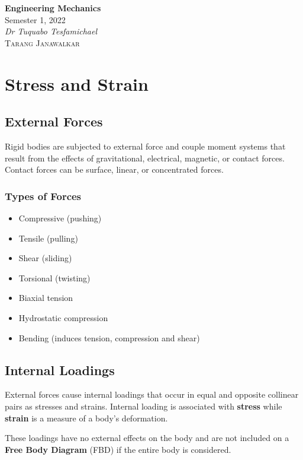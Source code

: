 \documentclass{article}
\date{}
\newcommand{\unitName}{Engineering Mechanics}
\newcommand{\unitTime}{Semester 1, 2022}
\newcommand{\unitCoordinator}{Dr Tuquabo Tesfamichael}
\newcommand{\documentAuthors}{\textsc{Tarang Janawalkar}}
\begin{document}
%
\begin{titlepage}
    \vspace*{\fill}
    \begin{center}
        \LARGE{\textbf{\unitName}} \\[0.1in]
        \normalsize{\unitTime} \\[0.2in]
        \normalsize\textit{\unitCoordinator} \\[0.2in]
        \documentAuthors
    \end{center}
    \vspace*{\fill}
    \doclicenseThis
    \thispagestyle{empty}
\end{titlepage}
\newpage
%
\tableofcontents
\newpage
%
\section{Stress and Strain}
\subsection{External Forces}
Rigid bodies are subjected to external force and couple moment systems that result from the effects of gravitational,
electrical, magnetic, or contact forces. Contact forces can be surface, linear, or concentrated forces.
\subsubsection{Types of Forces}
\begin{itemize}
    \item Compressive (pushing)
    \item Tensile (pulling)
    \item Shear (sliding)
    \item Torsional (twisting)
    \item Biaxial tension
    \item Hydrostatic compression
    \item Bending (induces tension, compression and shear)
\end{itemize}
\subsection{Internal Loadings}
External forces cause internal loadings that occur in equal and opposite collinear pairs as stresses and strains.
Internal loading is associated with \textbf{stress} while \textbf{strain} is a measure of a body's deformation.

These loadings have no external effects on the body and are not included on a \textbf{Free Body Diagram} (FBD) if
the entire body is considered.
\end{document}
